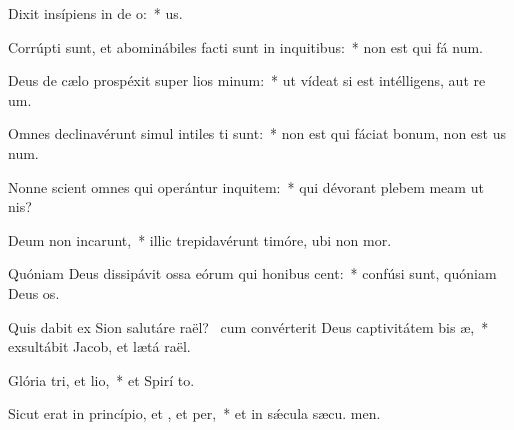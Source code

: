 \item Dixit insípiens in de o:~*   us.
\item Corrúpti sunt, et abominábiles facti sunt in inquitibus:~* non est qui fá num.
\item Deus de cælo prospéxit super lios minum:~* ut vídeat si est intélligens, aut re um.
\item Omnes declinavérunt simul intiles ti sunt:~* non est qui fáciat bonum, non est us  num.
\item Nonne scient omnes qui operántur inquitem:~* qui dévorant plebem meam ut  nis?
\item Deum non incarunt,~* illic trepidavérunt timóre, ubi non  mor.
\item Quóniam Deus dissipávit ossa eórum qui honibus cent:~* confúsi sunt, quóniam Deus  os.
\item Quis dabit ex Sion salutáre raël?~\pscross{} cum convérterit Deus captivitátem bis æ,~* exsultábit Jacob, et lætá raël.
\item Glória tri, et lio,~* et Spirí to.
\item Sicut erat in princípio, et , et per,~* et in sǽcula sæcu. men.
